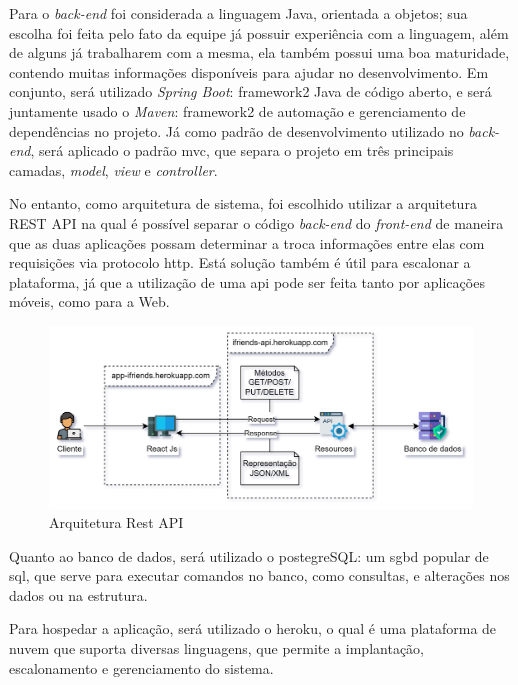 Para o \textsl{\gls{back-end}} foi considerada a linguagem Java, orientada a objetos; sua escolha foi feita pelo fato da equipe já possuir experiência com a linguagem, além de alguns já trabalharem com a mesma, ela também possui uma boa maturidade, contendo muitas informações disponíveis para ajudar no desenvolvimento. Em conjunto, será utilizado \textit{Spring Boot}: \gls{framework2} Java de código aberto, e será juntamente usado o \textit{Maven}: \gls{framework2} de automação e gerenciamento de dependências no projeto.  Já como padrão de desenvolvimento utilizado no  \textsl{\gls{back-end}}, será aplicado o padrão \acs{mvc}, que separa o projeto em três principais camadas, \textit{model}, \textit{view} e \textit{controller}.

No entanto, como arquitetura de sistema, foi escolhido utilizar a arquitetura \gls{REST API} na qual é possível separar o código \textsl{\gls{back-end}} do \textsl{\gls{front-end}} de maneira que as duas aplicações possam determinar a troca informações entre elas com requisições via protocolo \acs{http}. Está solução também é útil para escalonar a plataforma, já que a utilização de uma \acs{api} pode ser feita tanto por aplicações móveis, como para a Web.

\begin{figure}[htb]
\centering
\caption{Arquitetura Rest API}
\label{Arquitetura_Rest_API}
\includegraphics[width=1.0\textwidth]{anexos/Imagens_Diagramas/Arquitetura-Rest-API.png}
\end{figure}

Quanto ao banco de dados, será utilizado o \gls{postegreSQL}: um \acs{sgbd} popular de \acs{sql}, que serve para executar comandos no banco, como consultas, e alterações nos dados ou na estrutura.


Para hospedar a aplicação, será utilizado o \gls{heroku}, o qual é uma plataforma de nuvem que suporta diversas linguagens, que permite a implantação, escalonamento e gerenciamento do sistema.

